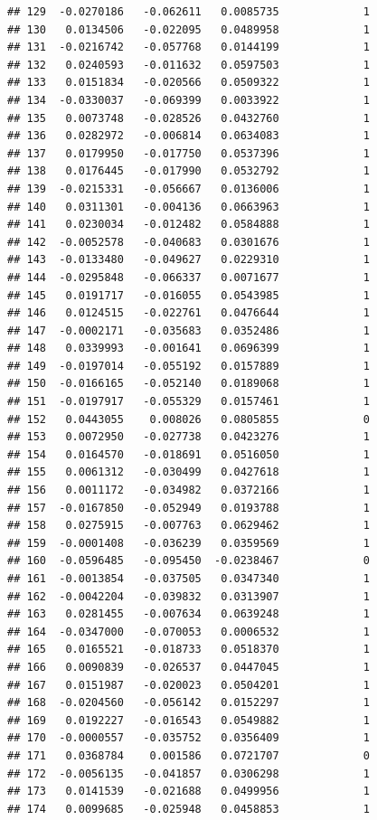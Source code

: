 \documentclass[12pt]{article}\usepackage[]{graphicx}\usepackage[]{xcolor}
\makeatletter
\newenvironment{kframe}{%
 \def\at@end@of@kframe{}%
 \ifinner\ifhmode%
  \def\at@end@of@kframe{\end{minipage}}%
  \begin{minipage}{\columnwidth}%
 \fi\fi%
 \def\FrameCommand##1{\hskip\@totalleftmargin \hskip-\fboxsep
 \colorbox{shadecolor}{##1}\hskip-\fboxsep
     \hskip-\linewidth \hskip-\@totalleftmargin \hskip\columnwidth}%
 \MakeFramed {\advance\hsize-\width
   \@totalleftmargin\z@ \linewidth\hsize
   \@setminipage}}%
 {\par\unskip\endMakeFramed%
 \at@end@of@kframe}
\newenvironment{knitrout}{}{} %
\makeatother
\begin{document}
\begin{knitrout}
\begin{kframe}
\begin{verbatim}
## 129  -0.0270186   -0.062611   0.0085735             1
## 130   0.0134506   -0.022095   0.0489958             1
## 131  -0.0216742   -0.057768   0.0144199             1
## 132   0.0240593   -0.011632   0.0597503             1
## 133   0.0151834   -0.020566   0.0509322             1
## 134  -0.0330037   -0.069399   0.0033922             1
## 135   0.0073748   -0.028526   0.0432760             1
## 136   0.0282972   -0.006814   0.0634083             1
## 137   0.0179950   -0.017750   0.0537396             1
## 138   0.0176445   -0.017990   0.0532792             1
## 139  -0.0215331   -0.056667   0.0136006             1
## 140   0.0311301   -0.004136   0.0663963             1
## 141   0.0230034   -0.012482   0.0584888             1
## 142  -0.0052578   -0.040683   0.0301676             1
## 143  -0.0133480   -0.049627   0.0229310             1
## 144  -0.0295848   -0.066337   0.0071677             1
## 145   0.0191717   -0.016055   0.0543985             1
## 146   0.0124515   -0.022761   0.0476644             1
## 147  -0.0002171   -0.035683   0.0352486             1
## 148   0.0339993   -0.001641   0.0696399             1
## 149  -0.0197014   -0.055192   0.0157889             1
## 150  -0.0166165   -0.052140   0.0189068             1
## 151  -0.0197917   -0.055329   0.0157461             1
## 152   0.0443055    0.008026   0.0805855             0
## 153   0.0072950   -0.027738   0.0423276             1
## 154   0.0164570   -0.018691   0.0516050             1
## 155   0.0061312   -0.030499   0.0427618             1
## 156   0.0011172   -0.034982   0.0372166             1
## 157  -0.0167850   -0.052949   0.0193788             1
## 158   0.0275915   -0.007763   0.0629462             1
## 159  -0.0001408   -0.036239   0.0359569             1
## 160  -0.0596485   -0.095450  -0.0238467             0
## 161  -0.0013854   -0.037505   0.0347340             1
## 162  -0.0042204   -0.039832   0.0313907             1
## 163   0.0281455   -0.007634   0.0639248             1
## 164  -0.0347000   -0.070053   0.0006532             1
## 165   0.0165521   -0.018733   0.0518370             1
## 166   0.0090839   -0.026537   0.0447045             1
## 167   0.0151987   -0.020023   0.0504201             1
## 168  -0.0204560   -0.056142   0.0152297             1
## 169   0.0192227   -0.016543   0.0549882             1
## 170  -0.0000557   -0.035752   0.0356409             1
## 171   0.0368784    0.001586   0.0721707             0
## 172  -0.0056135   -0.041857   0.0306298             1
## 173   0.0141539   -0.021688   0.0499956             1
## 174   0.0099685   -0.025948   0.0458853             1

\end{verbatim}
\end{kframe}
\end{knitrout}
\end{document}
